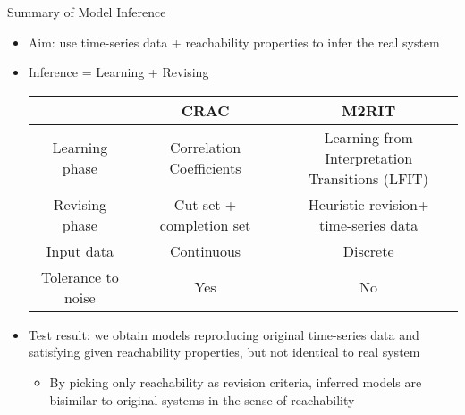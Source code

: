 \documentclass[8pt]{beamer}
\begin{document}
\begin{frame}{Summary of Model Inference}    
\begin{itemize}
\item Aim: use time-series data + reachability properties to infer the real system
\pause
\item Inference = Learning + Revising
\pause
\begin{tabular}{c|c|c}
     &CRAC & M2RIT \\
     \hline
    Learning phase & Correlation Coefficients & \makecell{Learning from Interpretation\\ Transitions (LFIT)}
    \pause\\
     \hline
     Revising phase & \makecell{Cut set +\\ completion set} & \makecell{Heuristic revision+\\time-series data}
     \pause\\
     \hline
     Input data &Continuous & Discrete
     \pause\\
     \hline
     \makecell{Tolerance to\\ noise}&Yes&No
\end{tabular}
\pause
\item Test result: we obtain models reproducing original time-series data and satisfying given reachability properties, but not identical to real system
\pause
\begin{itemize}
    \item By picking only reachability as revision criteria, inferred models are bisimilar to original systems in the sense of reachability
\end{itemize}
\end{itemize}
\end{frame}
\end{document}
